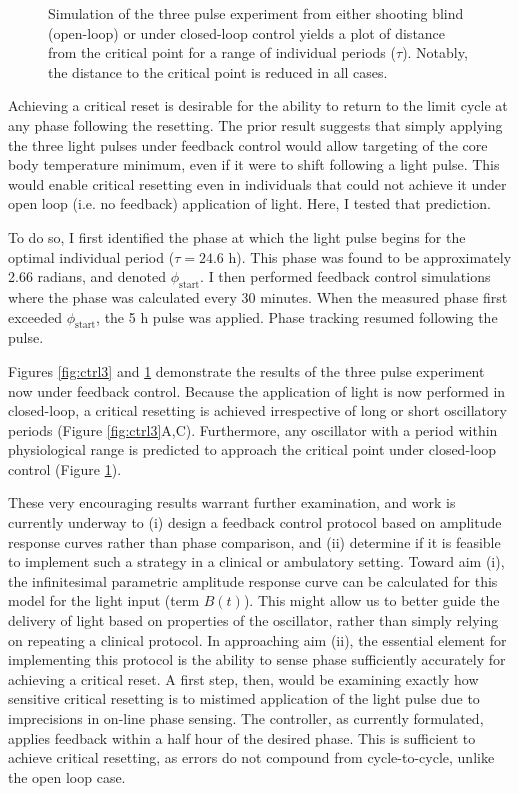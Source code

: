 {\begin{figure}[p]
\begin{center}
    \end{center}
        \caption{\label{fig:ctrl32} Simulation of the three pulse experiment from \cite{Kronauer1999} either shooting blind (open-loop) or under closed-loop control yields a plot of distance from the critical point for a range of individual periods ($\tau$). Notably, the distance to the critical point is reduced in all cases.}
\end{figure}
}

Achieving a critical reset is desirable for the ability to return to the limit cycle at any phase following the resetting.
The prior result suggests that simply applying the three light pulses under feedback control would allow targeting of the core body temperature minimum, even if it were to shift following a light pulse.
This would enable critical resetting even in individuals that could not achieve it under open loop (i.e. no feedback) application of light.
Here, I tested that prediction.

To do so, I first identified the phase at which the light pulse begins for the optimal individual period ($\tau = 24.6$ h).
This phase was found to be approximately 2.66 radians, and denoted $\phi_{\text{start}}$.
I then performed feedback control simulations where the phase was calculated every 30 minutes.
When the measured phase first exceeded $\phi_{\text{start}}$, the 5 h pulse was applied.
Phase tracking resumed following the pulse. 

Figures \ref{fig:ctrl3} and \ref{fig:ctrl32} demonstrate the results of the three pulse experiment now under feedback control.
Because the application of light is now performed in closed-loop, a critical resetting is achieved irrespective of long or short oscillatory periods (Figure \ref{fig:ctrl3}A,C).
Furthermore, any oscillator with a period within physiological range is predicted to approach the critical point under closed-loop control (Figure \ref{fig:ctrl32}).


These very encouraging results warrant further examination, and work is currently underway to (i) design a feedback control protocol based on amplitude response curves rather than phase comparison, and (ii) determine if it is feasible to implement such a strategy in a clinical or ambulatory setting.
Toward aim (i), the infinitesimal parametric amplitude response curve can be calculated for this model for the light input (term $B(t)$).
This might allow us to better guide the delivery of light based on properties of the oscillator, rather than simply relying on repeating a clinical protocol. 
In approaching aim (ii), the essential element for implementing this protocol is the ability to sense phase sufficiently accurately for achieving a critical reset.
A first step, then, would be examining exactly how sensitive critical resetting is to mistimed application of the light pulse due to imprecisions in on-line phase sensing.
The controller, as currently formulated, applies feedback within a half hour of the desired phase.
This is sufficient to achieve critical resetting, as errors do not compound from cycle-to-cycle, unlike the open loop case.

